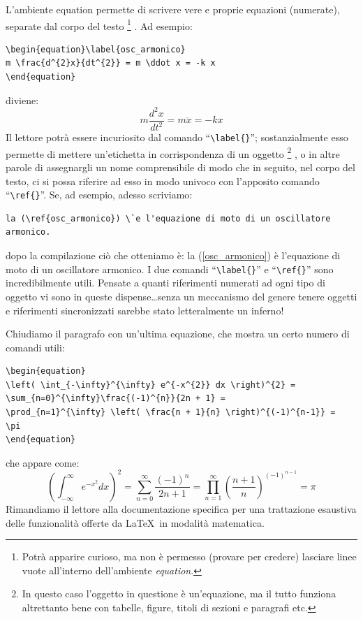 L'ambiente equation permette di scrivere vere e proprie equazioni (numerate),
separate dal corpo del testo%
\footnote{
Potr\`a apparire curioso, ma non \`e permesso (provare per credere) lasciare
linee vuote all'interno dell'ambiente \emph{equation}.
}%
. Ad esempio:
\begin{verbatim}
\begin{equation}\label{osc_armonico}
m \frac{d^{2}x}{dt^{2}} = m \ddot x = -k x
\end{equation}
\end{verbatim}
diviene:
\begin{equation}\label{osc_armonico}
m \frac{d^{2}x}{dt^{2}} = m \ddot x = -k x
\end{equation}
Il lettore potr\`a essere incuriosito dal comando ``\verb|\label{}|'';
sostanzialmente esso permette di mettere un'etichetta in corrispondenza di un
oggetto%
\footnote{
In questo caso l'oggetto in questione \`e un'equazione, ma il tutto funziona
altrettanto bene con tabelle, figure, titoli di sezioni e paragrafi etc.
}%
, o in altre parole di assegnargli un nome comprensibile di modo che in
seguito, nel corpo del testo, ci si possa riferire ad esso in modo
univoco con l'apposito comando ``\verb|\ref{}|''.
Se, ad esempio, adesso scriviamo:
\begin{verbatim}
la (\ref{osc_armonico}) \`e l'equazione di moto di un oscillatore armonico.
\end{verbatim}
dopo la compilazione ci\`o che otteniamo \`e:
la (\ref{osc_armonico}) \`e l'equazione di moto di un oscillatore armonico.
I due comandi ``\verb|\label{}|'' e ``\verb|\ref{}|'' sono incredibilmente
utili.
Pensate a quanti riferimenti numerati ad ogni tipo di oggetto vi sono in queste
dispense\ldots senza un meccanismo del genere tenere oggetti e riferimenti
sincronizzati sarebbe stato letteralmente un inferno!


Chiudiamo il paragrafo con un'ultima equazione, che mostra un certo numero
di comandi utili:
\begin{verbatim}
\begin{equation}
\left( \int_{-\infty}^{\infty} e^{-x^{2}} dx \right)^{2} =
\sum_{n=0}^{\infty}\frac{(-1)^{n}}{2n + 1} =
\prod_{n=1}^{\infty} \left( \frac{n + 1}{n} \right)^{(-1)^{n-1}} =
\pi
\end{equation}
\end{verbatim}
che appare come:
\begin{equation}
\left( \int_{-\infty}^{\infty} e^{-x^{2}} dx \right)^{2} =
\sum_{n=0}^{\infty}\frac{(-1)^{n}}{2n + 1} =
\prod_{n=1}^{\infty} \left( \frac{n + 1}{n} \right)^{(-1)^{n-1}} =
\pi
\end{equation}
Rimandiamo il lettore alla documentazione specifica per una trattazione
esaustiva delle funzionalit\`a offerte da \LaTeX\ in modalit\`a matematica.


